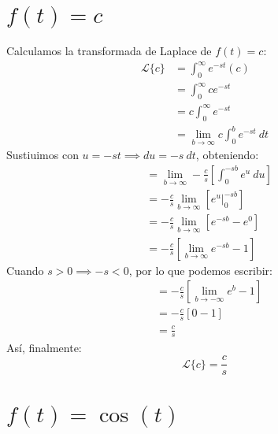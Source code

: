 \documentclass[12pt, a4paper]{article}
\begin{document}
\sffamily


\newpage

\setcounter{section}{1}
\section{\texorpdfstring{\(f(t) = c\)}{f (t) = c}}

Calculamos la transformada de Laplace de \(f(t) = c\):
\begin{align*}
    \mathcal{L}\{c\}&=\int_0^{\infty}e^{-st}(c)\\
    &=\int_0^{\infty}ce^{-st}\\
    &=c\int_0^{\infty}e^{-st}\\
    &=\lim_{b\to\infty}c\int_0^be^{-st}\ dt
\end{align*}
Sustiuimos con \(u=-st \implies du =-s\ dt\), obteniendo:
\begin{align*}
	&=\lim_{b\to\infty}-\frac{c}{s}\left[\int_0^{-sb}  e^u\ du\right] \\
	&=-\frac{c}{s}\lim_{b\to\infty}\left[e^u\big|_0^{-sb}  \right]\\
	&=-\frac{c}{s}\lim_{b\to\infty}\left[e^{-sb}-e^{0}\right]\\
	&=-\frac{c}{s} \left[ \lim_{b\to\infty} e^{-sb} - 1 \right]
\end{align*}
Cuando \(s > 0 \implies -s < 0\), por lo que podemos escribir:
\begin{align*}
	&= -\frac{c}{s} \left[ \lim_{b\to-\infty} e^{b} - 1 \right] \\
	&= -\frac{c}{s} \left[ 0 - 1 \right] \\
	&= \frac{c}{s}
\end{align*}
Así, finalmente:
\[
\mathcal{L}\{c\}=\frac{c}{s}
\]

\setcounter{section}{7}
\section{\texorpdfstring{\(f(t)=\cos(t)\)}{f (t) = cos (t)}}
\end{document}
